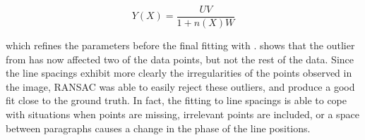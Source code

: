 \begin{equation}
Y(X) = \frac{ UV }{ 1+n(X)W }
\end{equation}

which refines the parameters before the final fitting with .
 shows that the outlier from  has now
affected two of the data points, but not the rest of the data.
Since the line spacings exhibit more clearly the irregularities of the points observed in the image,
RANSAC was able to easily reject these outliers, and produce a good fit close to the ground truth.
In fact, the fitting to line spacings is able to cope with situations
when points are missing, irrelevant points are included, or a space between paragraphs causes a change
in the phase of the line positions.

